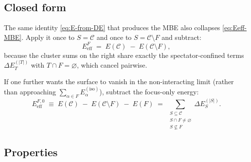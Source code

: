 \documentclass[11pt,a4paper]{article}
\newcommand{\Eiso}{E^{(\mathrm{iso})}}
\begin{document}
\subsection{Closed form}

The same identity \cref{eq:E-from-DE} that produces the MBE also collapses
\cref{eq:Eeff-MBE}. Apply it once to $S = \mathcal{C}$ and once to
$S = \mathcal{C} \setminus F$ and subtract:
\begin{equation}
\boxed{\;
E_{\mathrm{eff}}^{F}
\;=\; E(\mathcal{C}) \;-\; E(\mathcal{C} \setminus F),
\;}
\label{eq:Eeff-closed}
\end{equation}
because the cluster sums on the right share exactly the spectator-confined
terms $\Delta E^{(|T|)}_T$ with $T \cap F = \varnothing$, which cancel pairwise.

If one further wants the surface to vanish in the non-interacting limit
(rather than approaching $\sum_{\alpha \in F} \Eiso_\alpha$), subtract the
focus-only energy:
\begin{equation}
E_{\mathrm{eff}}^{F,0}
\;\equiv\; E(\mathcal{C}) \;-\; E(\mathcal{C} \setminus F) \;-\; E(F)
\;=\; \!\!\!\!\sum_{\substack{S \subseteq \mathcal{C}\\ S \cap F \ne \varnothing\\ S \not\subseteq F}}
       \!\!\!\! \Delta E^{(|S|)}_{S}.
\label{eq:Eeff0-closed}
\end{equation}

\subsection{Properties}
\end{document}
